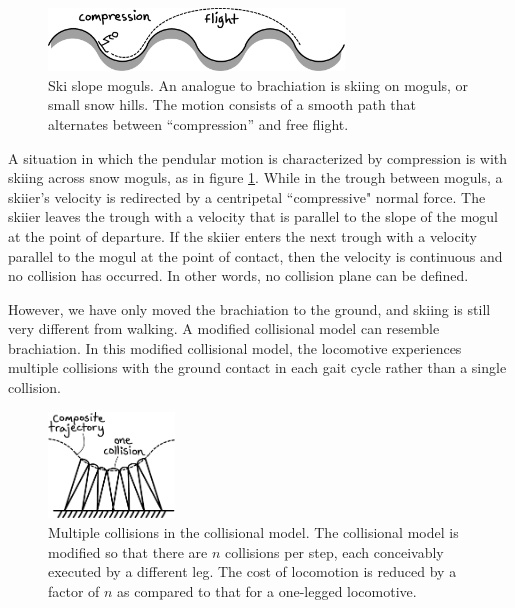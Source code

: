 \begin{figure}[h]		%
\begin{centering}
\includegraphics[width=0.7\textwidth]{Figures/Moguls}\par
\end{centering}
\caption[Diagram: Ski Slope Moguls]{Ski slope moguls. An analogue to brachiation is skiing on moguls, or small snow hills. The motion consists of a smooth path that alternates between ``compression'' and free flight.}
\label{fig:Moguls}
\end{figure}
%

A situation in which the pendular motion is characterized by compression is with skiing across snow moguls, as in figure \ref{fig:Moguls}. While in the trough between moguls, a skiier's velocity is redirected by a centripetal ``compressive" normal force. The skiier leaves the trough with a velocity that is parallel to the slope of the mogul at the point of departure. If the skiier enters the next trough with a velocity parallel to the mogul at the point of contact, then the velocity is continuous and no collision has occurred. In other words, no collision plane can be defined.

However, we have only moved the brachiation to the ground, and skiing is still very different from walking. A modified collisional model can resemble brachiation. In this modified collisional model, the locomotive experiences multiple collisions with the ground contact in each gait cycle rather than a single collision.

\begin{figure}[h]		%
\begin{centering}
\includegraphics[width=0.3\textwidth]{Figures/MultipleCollisions}\par
\end{centering}
\caption[Diagram: Multiple collisions in the Collisional Model]{Multiple collisions in the collisional model. The collisional model is modified so that there are $n$ collisions per step, each conceivably executed by a different leg. The cost of locomotion is reduced by a factor of $n$ as compared to that for a one-legged locomotive.}
\label{fig:MultipleCollisions}
\end{figure}
%

